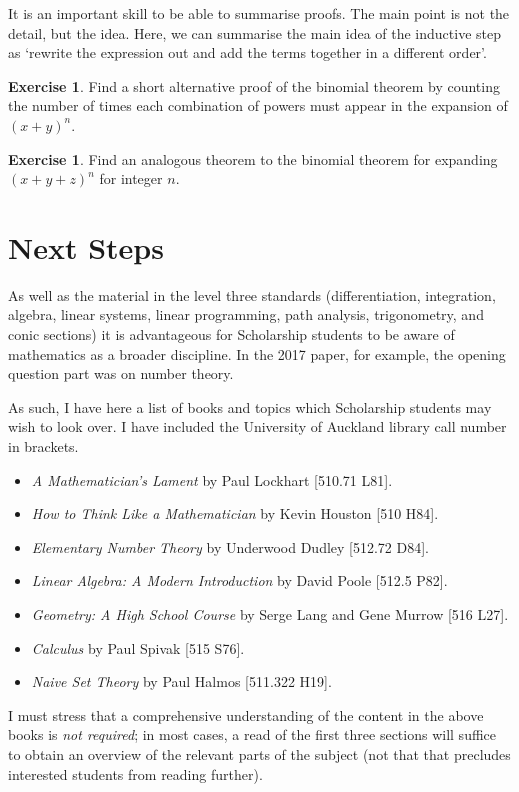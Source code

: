 \documentclass[a4paper,leqno]{article}
\numberwithin{equation}{section}
\theoremstyle{definition}
\newtheorem{exercise}[equation]{Exercise}
\theoremstyle{remark}
\begin{document}
It is an important skill to be able to summarise proofs. The main point is not the detail, but the idea. Here, we can summarise
the main idea of the inductive step as `rewrite the expression out and add the terms together in a different order'.

\begin{exercise}
  Find a short alternative proof of the binomial theorem by counting the number of times each combination of powers must
  appear in the expansion of $ (x + y)^n $.
\end{exercise}

\begin{exercise}
  Find an analogous theorem to the binomial theorem for expanding $ (x + y + z)^n $ for integer $ n $.
\end{exercise}

\section{Next Steps}
As well as the material in the level three standards (differentiation, integration, algebra, linear systems, linear programming, path analysis,
trigonometry, and conic sections) it is advantageous for Scholarship students to be aware of mathematics as a broader discipline. In the 2017
paper, for example, the opening question part was on number theory.

As such, I have here a list of books and topics which Scholarship students may wish to look over. I have included the University of Auckland
library call number in brackets.
\begin{itemize}
  \item \emph{A Mathematician's Lament} by Paul Lockhart [510.71 L81].
  \item \emph{How to Think Like a Mathematician} by Kevin Houston [510 H84].
  \item \emph{Elementary Number Theory} by Underwood Dudley [512.72 D84].
  \item \emph{Linear Algebra: A Modern Introduction} by David Poole [512.5 P82].
  \item \emph{Geometry: A High School Course} by Serge Lang and Gene Murrow [516 L27].
  \item \emph{Calculus} by Paul Spivak [515 S76].
  \item \emph{Naive Set Theory} by Paul Halmos [511.322 H19].
\end{itemize}

I must stress that a comprehensive understanding of the content in the above books is \emph{not required}; in most cases, a read of the first three
sections will suffice to obtain an overview of the relevant parts of the subject (not that that precludes interested students from reading further).
\end{document}

